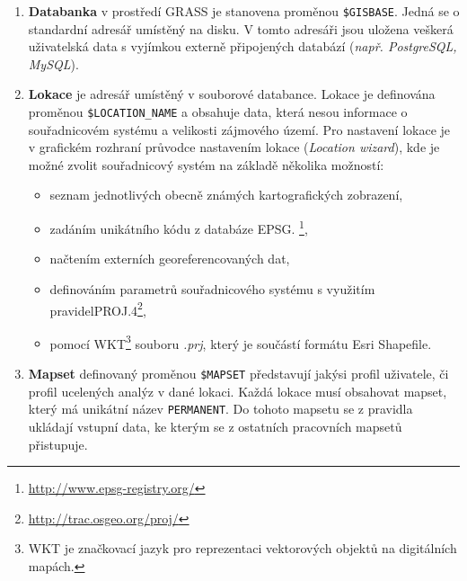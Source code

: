 \documentclass[a4paper,12pt,oneside]{report}
\begin{document}
\begin{enumerate}
\item \textbf{Databanka} v prostředí GRASS je stanovena proměnou
  \texttt{\$GISBASE}. Jedná se o standardní adresář umístěný na disku.
  V tomto adresáři jsou uložena veškerá uživatelská data s vyjímkou
  externě připojených databází (\textit{např. PostgreSQL, MySQL}).

\item \textbf{Lokace} je adresář umístěný v souborové
  databance. Lokace je definována proměnou \texttt{\$LOCATION\_NAME} a
  obsahuje data, která nesou informace o souřadni\-covém systému a
  velikosti zájmového území. Pro nastavení lokace je v grafickém
  rozhraní průvodce nastavením lokace (\textit{Location wizard}), kde
  je možné zvolit souřadnicový systém na základě několika možností:
\begin{itemize}
\item seznam jednotlivých obecně známých kartografických zobrazení, 
\item zadáním unikátního kódu z databáze    \acs{EPSG}. \footnote{\url{http://www.epsg-registry.org/}},
\item načtením externích georeferencovaných dat,
\item definováním parametrů souřadnicového systému s využitím pravidel\newline PROJ.4\footnote{\url{http://trac.osgeo.org/proj/}},
\item pomocí \ac{WKT}\footnote{WKT je značkovací jazyk pro reprezentaci vektorových objektů na digitálních mapách.} souboru \emph{.prj}, který je součástí formátu Esri Shapefile.
\end{itemize}

\item \textbf{Mapset} definovaný proměnou \texttt{\$MAPSET}
  představují jakýsi profil uživatele, či profil ucelených analýz v
  dané lokaci. Každá lokace musí obsahovat mapset, který má unikátní
  název \texttt{PERMANENT}. Do tohoto mapsetu se z pravidla ukládají
  vstupní data, ke kterým se z ostatních pracovních mapsetů
  přistupuje.
\end{enumerate}
\end{document}
